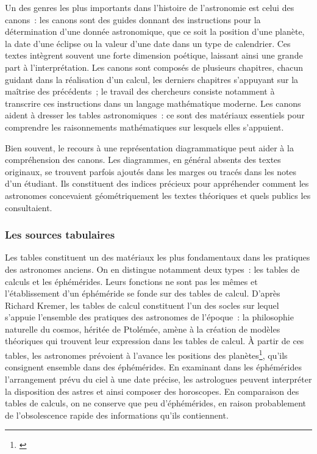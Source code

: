 \documentclass[a4paper,12pt,twoside]{book}
\begin{document}
Un des genres les plus importants dans l'histoire de l'astronomie est celui des canons~: les canons sont des guides donnant des instructions pour la détermination d'une donnée astronomique, que ce soit la position d'une planète, la date d'une éclipse ou la valeur d'une date dans un type de calendrier. Ces textes intègrent souvent une forte dimension poétique, laissant ainsi une grande part à l'interprétation. Les canons sont composés de plusieurs chapitres, chacun guidant dans la réalisation d'un calcul, les derniers chapitres s'appuyant sur la maîtrise des précédents~; le travail des chercheurs consiste notamment à transcrire ces instructions dans un langage mathématique moderne. Les canons aident à dresser les tables astronomiques~: ce sont des matériaux essentiels pour comprendre les raisonnements mathématiques sur lesquels elles s'appuient.

Bien souvent, le recours à une représentation diagrammatique peut aider à la compréhension des canons. Les diagrammes, en général absents des textes originaux, se trouvent parfois ajoutés dans les marges ou tracés dans les notes d'un étudiant. Ils constituent des indices précieux pour appréhender comment les astronomes concevaient géométriquement les textes théoriques et quels publics les consultaient.

			\subsubsection{Les sources tabulaires}
Les tables constituent un des matériaux les plus fondamentaux dans les pratiques des astronomes anciens. On en distingue notamment deux types~: les tables de calculs et les éphémérides. Leurs fonctions ne sont pas les mêmes et l'établissement d'un éphéméride se fonde sur des tables de calcul. D'après Richard Kremer, les tables de calcul constituent l'un des socles sur lequel s'appuie l'ensemble des pratiques des astronomes de l'époque~: la philosophie naturelle du cosmos, héritée de Ptolémée, amène à la création de modèles théoriques qui trouvent leur expression dans les tables de calcul. À partir de ces tables, les astronomes prévoient à l'avance les positions des planètes\footnote{\cite{poullePositionsPlanetesAu1967a}}, qu'ils consignent ensemble dans des éphémérides. En examinant dans les éphémérides l'arrangement prévu du ciel à une date précise, les astrologues peuvent interpréter la disposition des astres et ainsi composer des horoscopes. En comparaison des tables de calculs, on ne conserve que peu d'éphémérides, en raison probablement de l'obsolescence rapide des informations qu'ils contiennent.
\end{document}
